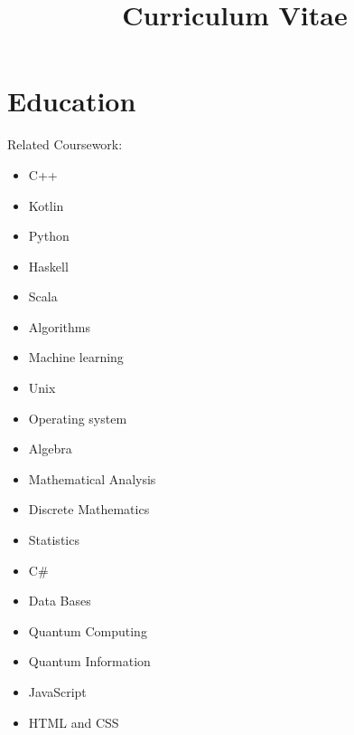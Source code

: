 \documentclass[11pt,a4paper,sans]{moderncv}        %
\title{Curriculum Vitae}
\begin{document}
	\vspace*{-1.05mm}
	\makecvtitle
	\vspace*{-10mm}
	
	\section{Education}
	{}{Related Coursework:}
	\vspace{-1.0em}\begin{small}
		\begin{multicols}{4}
			\begin{itemize}
				\item C++
				\item Kotlin
				\item Python
				\item Haskell
				\item Scala
				\item Algorithms
				\item Machine learning
				\item Unix
				\item Operating system
				\item Algebra
				\item Mathematical Analysis
				\item Discrete Mathematics
				\item Statistics
				\item C\#
				\item Data Bases
				\item Quantum Computing
				\item Quantum Information
				\item JavaScript
				\item HTML and CSS
			\end{itemize}
	\end{multicols}\end{small}
	
\end{document}
